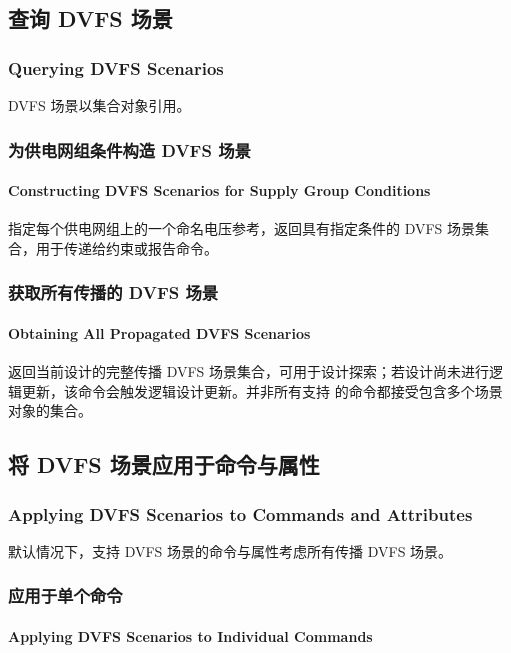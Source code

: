 \subsection{查询 DVFS 场景}
\subsubsection*{Querying DVFS Scenarios}

DVFS 场景以集合对象引用。

\subsubsection{为供电网组条件构造 DVFS 场景}
\paragraph*{Constructing DVFS Scenarios for Supply Group Conditions}

指定每个供电网组上的一个命名电压参考，返回具有指定条件的 DVFS 场景集合，用于传递给约束或报告命令。

\subsubsection{获取所有传播的 DVFS 场景}
\paragraph*{Obtaining All Propagated DVFS Scenarios}

 返回当前设计的完整传播 DVFS 场景集合，可用于设计探索；若设计尚未进行逻辑更新，该命令会触发逻辑设计更新。并非所有支持  的命令都接受包含多个场景对象的集合。

\subsection{将 DVFS 场景应用于命令与属性}
\subsubsection*{Applying DVFS Scenarios to Commands and Attributes}

默认情况下，支持 DVFS 场景的命令与属性考虑所有传播 DVFS 场景。

\subsubsection{应用于单个命令}
\paragraph*{Applying DVFS Scenarios to Individual Commands}

